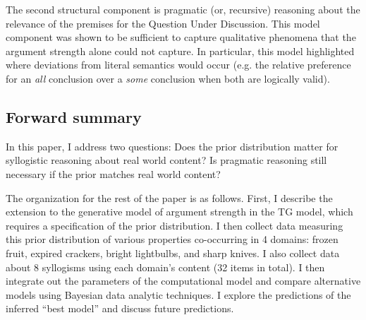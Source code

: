 \documentclass{llncs} %
\begin{document}
The second structural component is pragmatic (or, recursive) reasoning about the relevance of the premises for the Question Under Discussion. This model component was shown to be sufficient to capture qualitative phenomena that the argument strength alone could not capture. In particular, this model highlighted where deviations from literal semantics would occur (e.g. the relative preference for an \emph{all} conclusion over a \emph{some} conclusion when both are logically valid). 

\subsection{Forward summary}

In this paper, I address two questions: Does the prior distribution matter for syllogistic reasoning about real world content? Is pragmatic reasoning still necessary if the prior matches real world content? 

The organization for the rest of the paper is as follows. First, I describe the extension to the generative model of argument strength in the TG model, which requires a specification of the prior distribution. I then collect data measuring this prior distribution of various properties co-occurring in 4 domains: frozen fruit, expired crackers, bright lightbulbs, and sharp knives. I also collect data about 8 syllogisms using each domain's content (32 items in total). I then integrate out the parameters of the computational model and compare alternative models using Bayesian data analytic techniques. I explore the predictions of the inferred ``best model'' and discuss future predictions. 
\end{document}
